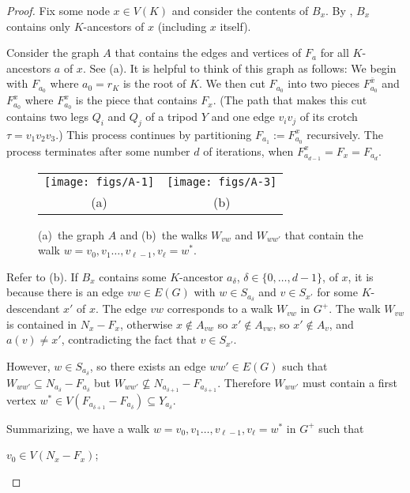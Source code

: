\documentclass{patmorin}
\begin{document}
\begin{proof}
  Fix some node $x\in V(K)$ and consider the contents of $B_x$.  By , $B_x$ contains only $K$-ancestors of $x$ (including $x$ itself). 
  
  Consider the graph $A$ that contains the edges and vertices of $F_{a}$ for all $K$-ancestors $a$ of $x$. See (a).  It is helpful to think of this graph as follows:  We begin with $F_{a_0}$ where $a_0=r_K$ is the root of $K$.  We then cut $F_{a_0}$ into two pieces $F^{\bar{x}}_{a_0}$ and $F^x_{a_0}$ where $F^x_{a_0}$ is the piece that contains $F_x$. (The path that makes this cut contains two legs $Q_i$ and $Q_j$ of a tripod $Y$ and one edge $v_iv_j$ of its crotch $\tau=v_1v_2v_3$.)  This process continues by partitioning $F_{a_1}:=F^x_{a_0}$ recursively.  The process terminates after some number $d$ of iterations, when $F^x_{a_{d-1}}=F_x=F_{a_d}$.

  \begin{figure}
    \begin{center}
      \begin{tabular}{cc}
        \texttt{[image: figs/A-1]} &
        \texttt{[image: figs/A-3]} \\ (a) & (b)
      \end{tabular}
    \end{center}
    \caption{(a)~the graph $A$ and (b)~the walks $W_{vw}$ and $W_{ww'}$ that contain the walk $w=v_0,v_1\ldots,v_{\ell-1},v_\ell=w^*$.}
  \end{figure}

  Refer to (b).  If $B_x$ contains some $K$-ancestor $a_\delta$, $\delta\in\{0,\ldots,d-1\}$, of $x$, it is because there is an edge $vw\in E(G)$ with $w\in S_{a_\delta}$ and $v\in S_{x'}$ for some $K$-descendant $x'$ of $x$.  The edge $vw$ corresponds to a walk $W_{vw}$ in $G^+$. The walk $W_{vw}$ is contained in $N_x-F_x$, otherwise $x\not\in A_{vw}$ so $x'\not\in A_{vw}$, so $x'\not\in A_v$, and $a(v)\neq x'$, contradicting the fact that $v\in S_{x'}$.
  
  However, $w\in S_{a_\delta}$, so there exists an edge $ww'\in E(G)$ such that $W_{ww'}\subseteq N_{a_\delta}-F_{a_\delta}$ but $W_{ww'}\not\subseteq N_{a_{\delta+1}}-F_{a_{\delta+1}}$.  Therefore $W_{ww'}$ must contain a first vertex $w^*\in V(F_{a_{\delta+1}}-F_{a_\delta})\subseteq Y_{a_\delta}$.

  Summarizing, we have a walk $w=v_0,v_1\ldots,v_{\ell-1},v_\ell=w^*$ in $G^+$ such that
  \begin{compactenum}[(i)]
    \item $v_0\in V(N_x-F_x)$;
    

\end{compactenum}
\end{proof}
\end{document}
